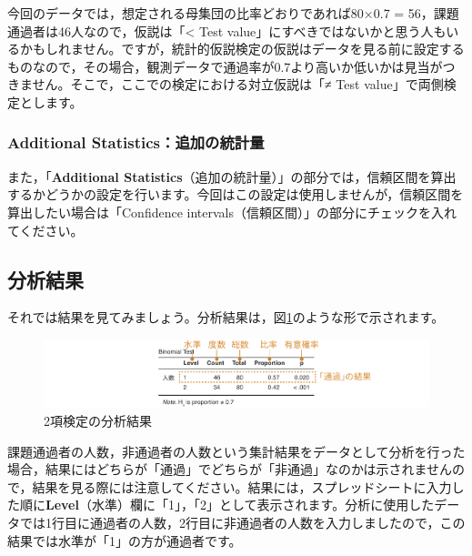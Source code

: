 \documentclass[
  12pt,
  a5jpaper,
  lualatex, ja=standard]{bxjsbook}
\begin{document}
今回のデータでは，想定される母集団の比率どおりであれば80×0.7 = 56，課題通過者は46人なので，仮説は「\textless{} Test value」にすべきではないかと思う人もいるかもしれません。ですが，統計的仮説検定の仮説はデータを見る前に設定するものなので，その場合，観測データで通過率が0.7より高いか低いかは見当がつきません。そこで，ここでの検定における対立仮説は「≠ Test value」で両側検定とします。

\hypertarget{additional-statisticsux8ffdux52a0ux306eux7d71ux8a08ux91cf-1}{%
\subsubsection*{Additional Statistics：追加の統計量}\label{additional-statisticsux8ffdux52a0ux306eux7d71ux8a08ux91cf-1}}

また，「\textbf{Additional Statistics}（追加の統計量）」の部分では，信頼区間を算出するかどうかの設定を行います。今回はこの設定は使用しませんが，信頼区間を算出したい場合は「Confidence intervals（信頼区間）」の部分にチェックを入れてください。

\hypertarget{sub:frequencies-binomial-results}{%
\subsection{分析結果}\label{sub:frequencies-binomial-results}}

それでは結果を見てみましょう。分析結果は，図\ref{fig:frequencies-binomial-results}のような形で示されます。

\begin{figure}[!ht]

{\centering \includegraphics[width=1\linewidth]{images/frequencies/binomial-results} 

}

\caption{2項検定の分析結果}\label{fig:frequencies-binomial-results}
\end{figure}

課題通過者の人数，非通過者の人数という集計結果をデータとして分析を行った場合，結果にはどちらが「通過」でどちらが「非通過」なのかは示されませんので，結果を見る際には注意してください。結果には，スプレッドシートに入力した順に\textbf{Level}（水準）欄に「1」，「2」として表示されます。分析に使用したデータでは1行目に通過者の人数，2行目に非通過者の人数を入力しましたので，この結果では水準が「1」の方が通過者です。
\end{document}
